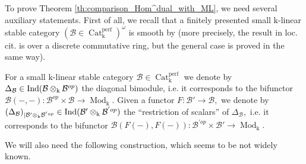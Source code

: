 \documentclass[11pt,leqno]{amsart}
\numberwithin{equation}{section}
\newcommand{\tens}[1]{%
  \mathbin{\mathop{\otimes}\displaylimits_{#1}}%
}
\newcommand{\Cat}{\operatorname{Cat}}
\newcommand{\mk}{\mathrm k}
\newcommand{\cB}{{\mathcal B}}
\newcommand{\perf}{\operatorname{perf}}
\newcommand{\Ind}{\operatorname{Ind}}
\newcommand{\Mod}{\operatorname{Mod}}
\begin{document}
 To prove Theorem \ref{th:comparison_Hom^dual_with_ML}, we need several auxiliary statements. First of all, we recall that a finitely presented small $\mk$-linear stable category $(\cB\in\Cat_{\mk}^{\perf})^{\omega}$ is smooth by \cite[Proposition 2.14]{TV07} (more precisely, the result in loc. cit. is over a discrete commutative ring, but the general case is proved in the same way). 
 
 For a small $\mk$-linear stable category $\cB\in\Cat^{\perf}_{\mk}$ we denote by $\Delta_{\cB}\in\Ind(\cB\tens{\mk}\cB^{op})$ the diagonal bimodule, i.e. it corresponds to the bifunctor $\cB(-,-):\cB^{op}\times\cB\to\Mod_{\mk}.$ Given a functor $F:\cB'\to \cB,$ we denote by $(\Delta_{\cB})_{\mid \cB'\tens{\mk}\cB^{'op}}\in\Ind(\cB'\tens{\mk}\cB^{'op})$ the ``restriction of scalars'' of $\Delta_{\cB},$ i.e. it corresponds to the bifunctor $\cB(F(-),F(-)):\cB^{'op}\times\cB'\to\Mod_{\mk}.$

We will also need the following construction, which seems to be not widely known.
\end{document}
